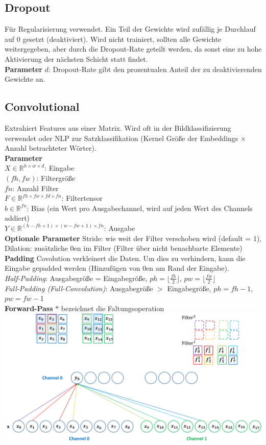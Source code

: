 \documentclass[12pt]{article}
\newcommand{\R}{\mathbb{R}}
\begin{document}
	\subsection{Dropout}
	Für Regularisierung verwendet. Ein Teil der Gewichte wird zufällig je Durchlauf auf 0 gesetzt (deaktiviert). Wird nicht trainiert, sollten alle Gewichte weitergegeben, aber durch die Dropout-Rate geteilt werden, da sonst eine zu hohe Aktivierung der nächsten Schicht statt findet.\\
	\textbf{Parameter} $d$: Dropout-Rate gibt den prozentualen Anteil der zu deaktivierenden Gewichte an.
	\subsection{Convolutional}
	Extrahiert Features aus einer Matrix. Wird oft in der Bildklassifizierung verwendet oder NLP zur Satzklassifikation (Kernel Größe der Embeddings $\times$ Anzahl betrachteter Wörter).\\
	\textbf{Parameter}\\
	$X \in \R^{h \times w \times d}$: Eingabe\\
	$(fh, fw)$: Filtergröße\\
	$fn$: Anzahl Filter\\
	$F \in \R^{fh \times fw \times fd \times fn}$: Filtertensor\\
	$b \in \R^{fn}$: Bias (ein Wert pro Ausgabechannel, wird auf jeden Wert des Channels addiert)\\
	$Y \in \R^{(h-fh+1) \times (w-fw+1) \times fn}$: Ausgabe\\
	\textbf{Optionale Parameter} Stride: wie weit der Filter verschoben wird (default = 1), Dilation: zusätzliche 0en im Filter (Filter über nicht benachbarte Elemente)\\
	\textbf{Padding} Covolution verkleinert die Daten. Um dies zu verhindern, kann die Eingabe gepadded werden (Hinzufügen von 0en am Rand der Eingabe).\\
	\textit{Half-Padding}: Ausgabegröße = Eingabegröße, $ph = \lfloor \frac{fh}{2} \rfloor$, $pw = \lfloor \frac{fw}{2} \rfloor$\\
	\textit{Full-Padding (Full-Convolution)}: Ausgabegröße $>$ Eingabegröße, $ph = fh - 1$, $pw = fw - 1$\\
	\textbf{Forward-Pass} $*$ bezeichnet die Faltungsoperation\\
	\includegraphics[width=\linewidth]{figures/convolution.png}
\end{document}
